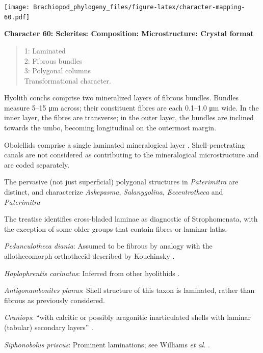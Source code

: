 \documentclass[]{book}
\theoremstyle{definition}
\theoremstyle{definition}
\theoremstyle{definition}
\theoremstyle{remark}
\begin{document}
\texttt{[image: Brachiopod\_phylogeny\_files/figure-latex/character-mapping-60.pdf]}

\textbf{Character 60: Sclerites: Composition: Microstructure: Crystal
format}

\begin{quote}
1: Laminated\\
2: Fibrous bundles\\
3: Polygonal columns\\
Transformational character.
\end{quote}

Hyolith conchs comprise two mineralized layers of fibrous bundles.
Bundles measure 5--15 μm across; their constituent fibres are each
0.1--1.0 μm wide. In the inner layer, the fibres are transverse; in the
outer layer, the bundles are inclined towards the umbo, becoming
longitudinal on the outermost margin.

Obolellids comprise a single laminated mineralogical layer
\citep{Balthasar2008iMummpikia}. Shell-penetrating canals are not
considered as contributing to the mineralogical microstructure and are
coded separately.

The pervasive (not just superficial) polygonal structures in
\emph{Paterimitra} are distinct, and characterize \emph{Askepasma},
\emph{Salanygolina}, \emph{Eccentrotheca} and \emph{Paterimitra}
\citep{Larsson2014iPaterimitra}

The treatise \citep{Williams2000BrachiopodaLinguliformea} identifies
cross-bladed laminae as diagnostic of Strophomenata, with the exception
of some older groups that contain fibres or laminar laths.

\emph{Pedunculotheca diania}: Assumed to be fibrous by analogy with the
allothecomorph orthothecid described by Kouchinsky
\citeyearpar{Kouchinsky2000Skeletalmicrostructures}.

\emph{Haplophrentis carinatus}: Inferred from other hyolithids
\citep[e.g.][]{Moore2018Plywoodlike}.

\emph{Antigonambonites planus}: Shell structure of this taxon is
laminated, rather than fibrous as previously considered.

\emph{Craniops}: ``with calcitic or possibly aragonitic inarticulated
shells with laminar (tabular) secondary layers''
\citep{Williams2000BrachiopodaLinguliformea}.

\emph{Siphonobolus priscus}: Prominent laminations; see Williams
\emph{et al}. \citeyearpar{Williams2004Chemicostructure}.
\end{document}
